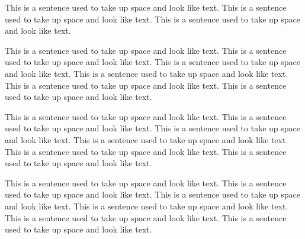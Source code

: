 

This is a sentence used to take up space and look like text.
This is a sentence used to take up space and look like text.
This is a sentence used to take up space and look like text.

This is a sentence used to take up space and look like text.
This is a sentence used to take up space and look like text.
This is a sentence used to take up space and look like text.
This is a sentence used to take up space and look like text.
This is a sentence used to take up space and look like text.
This is a sentence used to take up space and look like text.

This is a sentence used to take up space and look like text.
This is a sentence used to take up space and look like text.
This is a sentence used to take up space and look like text.
This is a sentence used to take up space and look like text.
This is a sentence used to take up space and look like text.
This is a sentence used to take up space and look like text.

This is a sentence used to take up space and look like text.
This is a sentence used to take up space and look like text.
This is a sentence used to take up space and look like text.
This is a sentence used to take up space and look like text.
This is a sentence used to take up space and look like text.
This is a sentence used to take up space and look like text.
